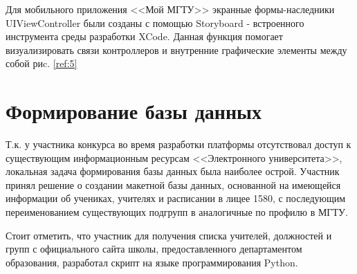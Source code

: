 \documentclass[12pt]{report}
\begin{document}
Для мобильного приложения <<Мой МГТУ>> экранные формы-наследники
UIViewController были созданы с помощью Storyboard - встроенного инструмента
среды разработки XCode. Данная функция помогает визуализировать связи 
контроллеров и внутренние графические элементы между собой риc. \ref{ref:5}

\begin{figure}[ht!]	
\end{figure}

\section{Формирование базы данных}

Т.к. у участника конкурса во время разработки платформы
отсутствовал доступ к существующим информационным ресурсам 
<<Электронного университета>>, локальная задача формирования
базы данных была наиболее острой.
Участник принял решение о создании макетной базы данных,
основанной на имеющейся информации об учениках,
учителях и расписании в лицее 1580, с последующим переименованием 
существующих подгрупп в аналогичные по профилю в МГТУ.

Стоит отметить, что участник для получения списка учителей, должностей и групп с официального сайта
школы, предоставленного департаментом образования, разработал скрипт на языке программирования Python. 
\end{document}
